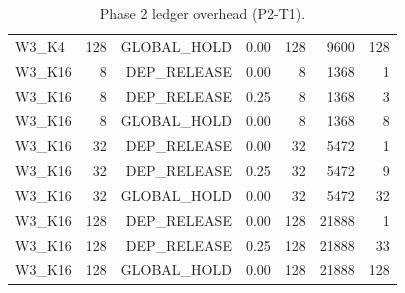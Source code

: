 \begin{table}[t]
\begin{tabular}{lrrrrrr}
W3\_K4 & 128 & GLOBAL\_HOLD & 0.00 & 128 & 9600 & 128 \\
W3\_K16 & 8 & DEP\_RELEASE & 0.00 & 8 & 1368 & 1 \\
W3\_K16 & 8 & DEP\_RELEASE & 0.25 & 8 & 1368 & 3 \\
W3\_K16 & 8 & GLOBAL\_HOLD & 0.00 & 8 & 1368 & 8 \\
W3\_K16 & 32 & DEP\_RELEASE & 0.00 & 32 & 5472 & 1 \\
W3\_K16 & 32 & DEP\_RELEASE & 0.25 & 32 & 5472 & 9 \\
W3\_K16 & 32 & GLOBAL\_HOLD & 0.00 & 32 & 5472 & 32 \\
W3\_K16 & 128 & DEP\_RELEASE & 0.00 & 128 & 21888 & 1 \\
W3\_K16 & 128 & DEP\_RELEASE & 0.25 & 128 & 21888 & 33 \\
W3\_K16 & 128 & GLOBAL\_HOLD & 0.00 & 128 & 21888 & 128 \\
\bottomrule
\end{tabular}
\caption{Phase 2 ledger overhead (P2-T1).}
\end{table}
